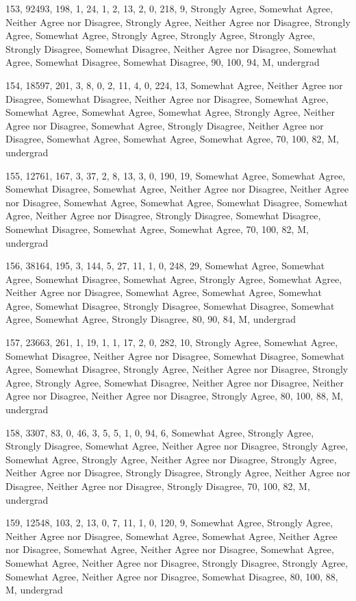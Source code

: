 \documentclass[12pt,twoside]{article}
\begin{document}
153, 92493, 198, 1, 24, 1, 2, 13, 2, 0, 218, 9, Strongly Agree, Somewhat
Agree, Neither Agree nor Disagree, Strongly Agree, Neither Agree nor
Disagree, Strongly Agree, Somewhat Agree, Strongly Agree, Strongly
Agree, Strongly Agree, Strongly Disagree, Somewhat Disagree, Neither
Agree nor Disagree, Somewhat Agree, Somewhat Disagree, Somewhat
Disagree, 90, 100, 94, M, undergrad

154, 18597, 201, 3, 8, 0, 2, 11, 4, 0, 224, 13, Somewhat Agree, Neither
Agree nor Disagree, Somewhat Disagree, Neither Agree nor Disagree,
Somewhat Agree, Somewhat Agree, Somewhat Agree, Somewhat Agree,
Strongly Agree, Neither Agree nor Disagree, Somewhat Agree, Strongly
Disagree, Neither Agree nor Disagree, Somewhat Agree, Somewhat Agree,
Somewhat Agree, 70, 100, 82, M, undergrad

155, 12761, 167, 3, 37, 2, 8, 13, 3, 0, 190, 19, Somewhat Agree,
Somewhat Agree, Somewhat Disagree, Somewhat Agree, Neither Agree nor
Disagree, Neither Agree nor Disagree, Somewhat Agree, Somewhat Agree,
Somewhat Disagree, Somewhat Agree, Neither Agree nor Disagree, Strongly
Disagree, Somewhat Disagree, Somewhat Disagree, Somewhat Agree,
Somewhat Agree, 70, 100, 82, M, undergrad

156, 38164, 195, 3, 144, 5, 27, 11, 1, 0, 248, 29, Somewhat Agree,
Somewhat Agree, Somewhat Disagree, Somewhat Agree, Strongly Agree,
Somewhat Agree, Neither Agree nor Disagree, Somewhat Agree, Somewhat
Agree, Somewhat Agree, Somewhat Disagree, Strongly Disagree, Somewhat
Disagree, Somewhat Agree, Somewhat Agree, Strongly Disagree, 80, 90,
84, M, undergrad

157, 23663, 261, 1, 19, 1, 1, 17, 2, 0, 282, 10, Strongly Agree,
Somewhat Agree, Somewhat Disagree, Neither Agree nor Disagree, Somewhat
Disagree, Somewhat Agree, Somewhat Disagree, Strongly Agree, Neither
Agree nor Disagree, Strongly Agree, Strongly Agree, Somewhat Disagree,
Neither Agree nor Disagree, Neither Agree nor Disagree, Neither Agree
nor Disagree, Strongly Agree, 80, 100, 88, M, undergrad

158, 3307, 83, 0, 46, 3, 5, 5, 1, 0, 94, 6, Somewhat Agree, Strongly
Agree, Strongly Disagree, Somewhat Agree, Neither Agree nor Disagree,
Strongly Agree, Somewhat Agree, Strongly Agree, Neither Agree nor
Disagree, Strongly Agree, Neither Agree nor Disagree, Strongly
Disagree, Strongly Agree, Neither Agree nor Disagree, Neither Agree nor
Disagree, Strongly Disagree, 70, 100, 82, M, undergrad

159, 12548, 103, 2, 13, 0, 7, 11, 1, 0, 120, 9, Somewhat Agree, Strongly
Agree, Neither Agree nor Disagree, Somewhat Agree, Somewhat Agree,
Neither Agree nor Disagree, Somewhat Agree, Neither Agree nor Disagree,
Somewhat Agree, Somewhat Agree, Neither Agree nor Disagree, Strongly
Disagree, Strongly Agree, Somewhat Agree, Neither Agree nor Disagree,
Somewhat Disagree, 80, 100, 88, M, undergrad
\end{document}
